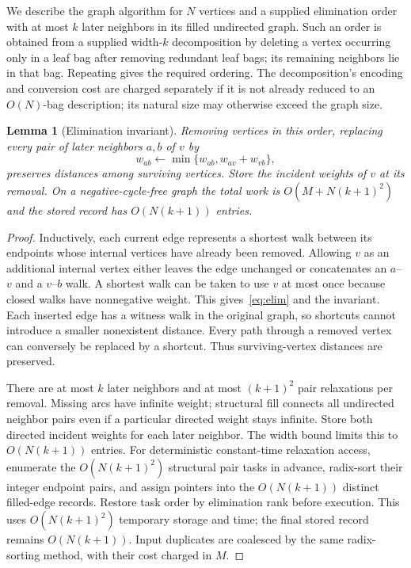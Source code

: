 \documentclass[manuscript,11pt,screen,nonacm]{acmart}
\newtheorem{lemma}[theorem]{Lemma}
\theoremstyle{definition}
\begin{document}
We describe the graph algorithm for $N$ vertices and a supplied elimination order with at most $k$ later neighbors in its filled undirected graph. Such an order is obtained from a supplied width-$k$ decomposition by deleting a vertex occurring only in a leaf bag after removing redundant leaf bags; its remaining neighbors lie in that bag. Repeating gives the required ordering. The decomposition's encoding and conversion cost are charged separately if it is not already reduced to an $O(N)$-bag description; its natural size may otherwise exceed the graph size.

\begin{lemma}[Elimination invariant]\label{lem:elim}
Removing vertices in this order, replacing every pair of later neighbors $a,b$ of $v$ by
\begin{equation}\label{eq:elim}
 w_{ab}\leftarrow\min\{w_{ab},w_{av}+w_{vb}\},
\end{equation}
preserves distances among surviving vertices. Store the incident weights of $v$ at its removal. On a negative-cycle-free graph the total work is $O(M+N(k+1)^2)$ and the stored record has $O(N(k+1))$ entries.
\end{lemma}
\begin{proof}
Inductively, each current edge represents a shortest walk between its endpoints whose internal vertices have already been removed. Allowing $v$ as an additional internal vertex either leaves the edge unchanged or concatenates an $a$--$v$ and a $v$--$b$ walk. A shortest walk can be taken to use $v$ at most once because closed walks have nonnegative weight. This gives~\eqref{eq:elim} and the invariant. Each inserted edge has a witness walk in the original graph, so shortcuts cannot introduce a smaller nonexistent distance. Every path through a removed vertex can conversely be replaced by a shortcut. Thus surviving-vertex distances are preserved.

There are at most $k$ later neighbors and at most $(k+1)^2$ pair relaxations per removal. Missing arcs have infinite weight; structural fill connects all undirected neighbor pairs even if a particular directed weight stays infinite. Store both directed incident weights for each later neighbor. The width bound limits this to $O(N(k+1))$ entries. For deterministic constant-time relaxation access, enumerate the $O(N(k+1)^2)$ structural pair tasks in advance, radix-sort their integer endpoint pairs, and assign pointers into the $O(N(k+1))$ distinct filled-edge records. Restore task order by elimination rank before execution. This uses $O(N(k+1)^2)$ temporary storage and time; the final stored record remains $O(N(k+1))$. Input duplicates are coalesced by the same radix-sorting method, with their cost charged in $M$.
\end{proof}
\end{document}
